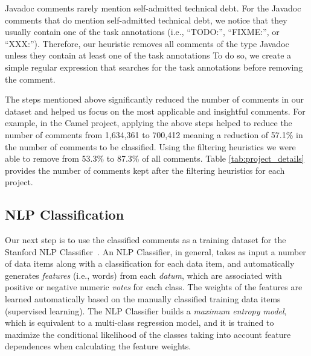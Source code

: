 Javadoc comments rarely mention self-admitted technical debt. For the Javadoc comments that do mention self-admitted technical debt, we notice that they usually contain one of the task annotations (i.e., ``TODO:'', ``FIXME:'', or ``XXX:''). Therefore, our heuristic removes all comments of the type Javadoc unless they contain at least one of the task annotations  To do so, we create a simple regular expression that searches for the task annotations before removing the comment.  

The steps mentioned above significantly reduced the number of comments in our dataset and helped us focus on the most applicable and insightful comments. For example, in the Camel project, applying the above steps helped to reduce the number of comments from 1,634,361 to 700,412 meaning a reduction of 57.1\% in the number of comments to be classified.  Using the filtering heuristics we were able to remove from 53.3\% to 87.3\% of all comments. Table \ref{tab:project_details} provides the number of comments kept after the filtering heuristics for each project.


\subsection*{NLP Classification}
\label{sub:nlp_classification}

Our next step is to use the classified \SATD comments as a training dataset for the Stanford NLP Classifier~\cite{Manning2014ACL}.
An NLP Classifier, in general, takes as input a number of data items along with a classification for each data item, and automatically generates \textit{features} (i.e., words) from each \textit{datum}, which are associated with positive or negative numeric \textit{votes} for each class. The weights of the features are learned automatically based on the manually classified training data items (supervised learning). The NLP Classifier builds a \textit{maximum entropy model}, which is equivalent to a multi-class regression model, and it is trained to maximize the conditional likelihood of the classes taking into account feature dependences when calculating the feature weights.

